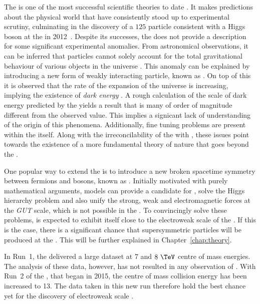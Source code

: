 The \SM is one of the most successful scientific theories to date
\cite{Salam:1964ry,Glashow:1961tr,PhysRevLett.19.1264}. It makes
predictions about the physical world that have consistently stood up
to experimental scrutiny, culminating in the discovery of a $125$\gev
particle consistent with a Higgs boson at the \LHC in
2012~\cite{1207.7214,1207.7235}.  Despite its successes, the \SM does
not provide a description for some significant experimental anomalies.
From astronomical observations, it can be inferred that \SM particles
cannot solely account for the total gravitational behaviour of various
objects in the universe
\cite{Kapteyn:1922zz,Oort:436532,Markevitch:2003at,2012Natur.487..202D,Ade:2015xua,0067-0049-180-2-225}.
This anomaly can be explained by introducing a new form of weakly
interacting particle, known as \emph{\DM}. On top of this it is observed
that the rate of the expansion of the universe is increasing, implying
the existence of \emph{dark energy} \cite{Weinberg:1988cp,Riess:1998cb}.
A rough calculation of the scale of dark energy predicted by the \SM
yields a result that is many of order of magnitude different from the
observed value.  This implies a signicant lack of understanding of the
origin of this phenomena.  Additionally, fine tuning problems are
present within the \SM itself.  Along with the irreconcilability of
the \SM with \GR, these issues point towards the existence of a more
fundamental theory of nature that goes beyond the \SM. 

One popular way to extend the \SM is to introduce a new broken
spacetime symmetry between fermions and bosons, known as \SUSY
\cite{Martin:1997ns}.  Initially motivated with purely mathematical
arguments, \SUSY models can provide a candidate for \DM, solve the
Higgs hierarchy problem and also unify the strong, weak and
electromagnetic forces at the \emph{GUT} scale, which is not possible
in the \SM. To convincingly solve these problems, \SUSY is expected to
exhibit itself close to the electroweak scale of the \SM. If this is
the case, there is a significant chance that supersymmetric particles
will be produced at the \LHC. This will be further explained in
Chapter~\ref{chap:theory}.

In Run~1, the \LHC delivered a large dataset at $7$ and $8~\tev$ centre
of mass energies. The analysis of these data, however, has not
resulted in any observation of \SUSY. With Run~2 of the
\LHC, that began in 2015, the centre of mass collision energy has been 
increased to 13\tev. The data taken in this new run therefore hold the
best chance yet for the discovery of electroweak scale \SUSY.


